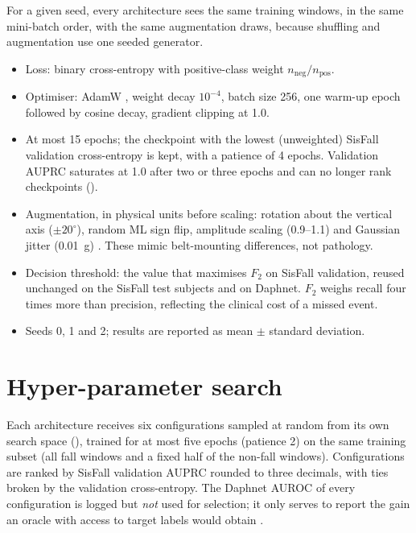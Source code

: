 For a given seed, every architecture sees the same training windows, in the same mini-batch order,
with the same augmentation draws, because shuffling and augmentation use one seeded generator.
\begin{itemize}
  \item Loss: binary cross-entropy with positive-class weight $n_{\mathrm{neg}}/n_{\mathrm{pos}}$.
  \item Optimiser: AdamW \parencite{loshchilov2019adamw}, weight decay $10^{-4}$, batch size 256, one warm-up epoch followed by cosine decay, gradient clipping at 1.0.
  \item At most 15 epochs; the checkpoint with the lowest (unweighted) SisFall validation cross-entropy is kept, with a patience of 4 epochs. Validation AUPRC saturates at 1.0 after two or three epochs and can no longer rank checkpoints ().
  \item Augmentation, in physical units before scaling: rotation about the vertical axis ($\pm20^\circ$), random ML sign flip, amplitude scaling (0.9--1.1) and Gaussian jitter (\SI{0.01}{g}) \parencite{um2017augmentation}. These mimic belt-mounting differences, not pathology.
  \item Decision threshold: the value that maximises $F_2$ on SisFall validation, reused unchanged on the SisFall test subjects and on Daphnet. $F_2$ weighs recall four times more than precision, reflecting the clinical cost of a missed event.
  \item Seeds 0, 1 and 2; results are reported as mean $\pm$ standard deviation.
\end{itemize}

\section{Hyper-parameter search}
\label{sec:hpo}

Each architecture receives six configurations sampled at random from its own search space
(), trained for at most five epochs (patience 2) on the same training subset (all fall
windows and a fixed half of the non-fall windows). Configurations are ranked by SisFall validation
AUPRC rounded to three decimals, with ties broken by the validation cross-entropy. The Daphnet AUROC of
every configuration is logged but \emph{not} used for selection; it only serves to report the
gain an oracle with access to target labels would obtain \parencite{gulrajani2021domainbed}.

